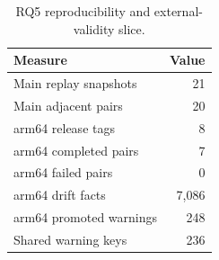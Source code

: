 \begin{table}[t]
\centering
\caption{RQ5 reproducibility and external-validity slice.}
\label{tab:rq5-reproducibility}
\begin{tabular}{lr}
\toprule
Measure & Value \\
\midrule
Main replay snapshots & 21 \\
Main adjacent pairs & 20 \\
arm64 release tags & 8 \\
arm64 completed pairs & 7 \\
arm64 failed pairs & 0 \\
arm64 drift facts & 7,086 \\
arm64 promoted warnings & 248 \\
Shared warning keys & 236 \\
\bottomrule
\end{tabular}
\end{table}
